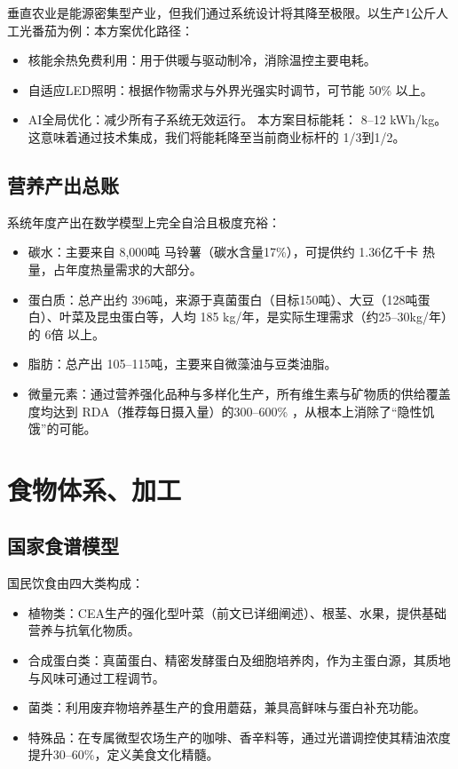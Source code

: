 垂直农业是能源密集型产业，但我们通过系统设计将其降至极限。以生产1公斤人工光番茄为例：本方案优化路径：

\begin{itemize}
\item
  核能余热免费利用：用于供暖与驱动制冷，消除温控主要电耗。
\item
  自适应LED照明：根据作物需求与外界光强实时调节，可节能 50\% 以上。
\item
  AI全局优化：减少所有子系统无效运行。
  本方案目标能耗： 8--12 kWh/kg。这意味着通过技术集成，我们将能耗降至当前商业标杆的 1/3到1/2。
\end{itemize}

\subsection{营养产出总账}\label{ux8425ux517bux4ea7ux51faux603bux8d26}

系统年度产出在数学模型上完全自洽且极度充裕：

\begin{itemize}
\item
  碳水：主要来自 8,000吨 马铃薯（碳水含量17\%），可提供约 1.36亿千卡 热量，占年度热量需求的大部分。
\item
  蛋白质：总产出约 396吨，来源于真菌蛋白（目标150吨）、大豆（128吨蛋白）、叶菜及昆虫蛋白等，人均 185 kg/年，是实际生理需求（约25--30kg/年）的 6倍 以上。
\item
  脂肪：总产出 105--115吨，主要来自微藻油与豆类油脂。
\item
  微量元素：通过营养强化品种与多样化生产，所有维生素与矿物质的供给覆盖度均达到 RDA（推荐每日摄入量）的300--600\% ，从根本上消除了``隐性饥饿''的可能。
\end{itemize}

\section{食物体系、加工}\label{ux98dfux7269ux4f53ux7cfbux52a0ux5de5}

\subsection{国家食谱模型}\label{ux56fdux5bb6ux98dfux8c31ux6a21ux578b}

国民饮食由四大类构成：

\begin{itemize}
\item
  植物类：CEA生产的强化型叶菜（前文已详细阐述）、根茎、水果，提供基础营养与抗氧化物质。
\item
  合成蛋白类：真菌蛋白、精密发酵蛋白及细胞培养肉，作为主蛋白源，其质地与风味可通过工程调节。
\item
  菌类：利用废弃物培养基生产的食用蘑菇，兼具高鲜味与蛋白补充功能。
\item
  特殊品：在专属微型农场生产的咖啡、香辛料等，通过光谱调控使其精油浓度提升30--60\%，定义美食文化精髓。
\end{itemize}

